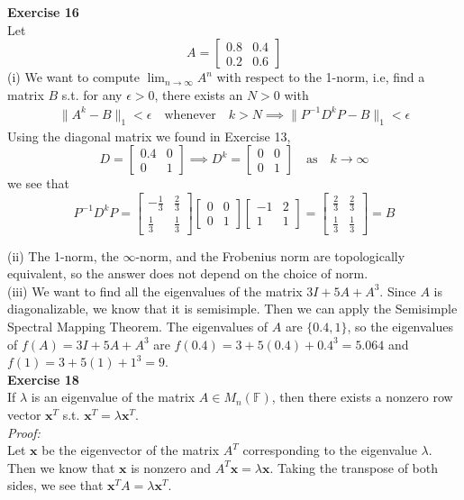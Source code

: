 \documentclass[letterpaper,12pt]{article}
\let\vec\mathbf
\theoremstyle{definition}
\begin{document}
\textbf{Exercise 16} \\
Let
\[ A =
\begin{bmatrix}
  0.8 & 0.4 \\
  0.2 & 0.6
\end{bmatrix}
\]
(i) We want to compute $\lim_{n \to \infty} A^n$ with respect to the 1-norm, i.e, find a matrix $B$ s.t. for any $\epsilon > 0$, there exists an $N > 0$ with
\begin{align*}
  \|A^k - B\|_1 < \epsilon \quad \text{whenever} \quad k > N \implies \|P^{-1}D^kP - B\|_1 < \epsilon
\end{align*}
Using the diagonal matrix we found in Exercise 13,
\[ D =
\begin{bmatrix}
  0.4 & 0 \\
  0 & 1
\end{bmatrix}
\implies
D^k =
\begin{bmatrix}
  0 & 0 \\
  0 & 1
\end{bmatrix}
\quad \text{as} \quad k \to \infty
\]
we see that
\[ P^{-1}D^kP =
\begin{bmatrix}
  -\frac{1}{3} & \frac{2}{3} \\
  \frac{1}{3} & \frac{1}{3}
\end{bmatrix}
\begin{bmatrix}
  0 & 0 \\
  0 & 1
\end{bmatrix}
\begin{bmatrix}
  -1 & 2 \\
  1 & 1
\end{bmatrix}
=
\begin{bmatrix}
  \frac{2}{3} & \frac{2}{3} \\
  \frac{1}{3} & \frac{1}{3}
\end{bmatrix}
= B
\]

(ii) The 1-norm, the $\infty$-norm, and the Frobenius norm are topologically equivalent, so the answer does not depend on the choice of norm. \\

(iii) We want to find all the eigenvalues of the matrix $3I + 5A + A^3$. Since $A$ is diagonalizable, we know that it is semisimple. Then we can apply the Semisimple Spectral Mapping Theorem. The eigenvalues of $A$ are $\{0.4, 1\}$, so the eigenvalues of $f(A) = 3I + 5A + A^3$ are $f(0.4) = 3 + 5(0.4) + 0.4^3 = 5.064$ and $f(1) = 3 + 5(1) + 1^3 = 9$. \\

\textbf{Exercise 18} \\
If $\lambda$ is an eigenvalue of the matrix $A \in M_n(
\mathbb{F})$, then there exists a nonzero row vector $\vec{x}^T$ s.t. $\vec{x}^T = \lambda \vec{x}^T$. \\
\textit{Proof:} \\
Let $\vec{x}$ be the eigenvector of the matrix $A^T$ corresponding to the eigenvalue $\lambda$. Then we know that $\vec{x}$ is nonzero and $A^T\vec{x} = \lambda\vec{x}$. Taking the transpose of both sides, we see that $\vec{x}^T A = \lambda\vec{x}^T$. \\
\end{document}
